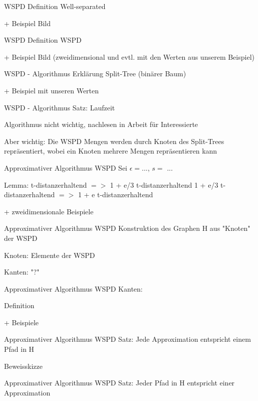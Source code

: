 \documentclass{beamer}
\begin{document}
	\begin{frame}{WSPD}
		Definition Well-separated
		
		+ Beispiel Bild
	\end{frame}
	
	\begin{frame}{WSPD}
		Definition WSPD
		
		+ Beispiel Bild (zweidimensional und evtl. mit den Werten aus unserem Beispiel)
	\end{frame}
	
	\begin{frame}{WSPD - Algorithmus}
		Erklärung Split-Tree (binärer Baum)
		
		+ Beispiel mit unseren Werten
	\end{frame}
	
	
	\begin{frame}{WSPD - Algorithmus}
		Satz: Laufzeit
		
		Algorithmus nicht wichtig, nachlesen in Arbeit für Interessierte
		
		Aber wichtig: Die WSPD Mengen werden durch Knoten des Split-Trees repräsentiert, wobei ein Knoten mehrere Mengen repräsentieren kann
	\end{frame}
	
	\begin{frame}{Approximativer Algorithmus WSPD}
		Sei $\epsilon = $..., $s = $ ...
		
		Lemma: 	t-distanzerhaltend $=>$ 1 + e/3 t-distanzerhaltend
				1 + e/3 t-distanzerhaltend $=>$ 1 + e t-distanzerhaltend
				
		+ zweidimensionale Beispiele
	\end{frame}
	
	\begin{frame}{Approximativer Algorithmus WSPD}
		Konstruktion des Graphen H aus "Knoten" der WSPD
		
		Knoten: Elemente der WSPD
		
		Kanten: "?"
	\end{frame}
	
	\begin{frame}{Approximativer Algorithmus WSPD}
		Kanten:
		
		Definition
		
		+ Beispiele
	\end{frame}
	
	\begin{frame}{Approximativer Algorithmus WSPD}
		Satz: Jede Approximation entspricht einem Pfad in H
		
		Beweisskizze
	\end{frame}
	
	\begin{frame}{Approximativer Algorithmus WSPD}
		Satz: Jeder Pfad in H entspricht einer Approximation
	\end{frame}
\end{document}
